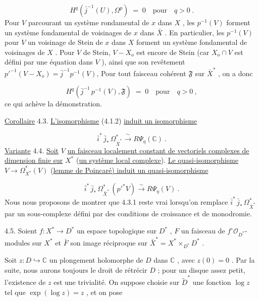 \begin{equation*}
H^q(\bar{j}^{-1}(U), \Omega^p) \;=\; 0 \quad \text{pour} \quad q > 0 \ .
\end{equation*}
Pour $V$ parcourant un système rondamental de $x$ dans $X$ , les $p^{-1}(V)$ forment un système fondamental de voisinages de $x$ dans $\bar{X}$ . En particulier, les $p^{-1}(V)$ pour $V$ un voisinage de Stein de $x$ dans $X$ forment un système fondamental de voisinages de $X$ . Pour $V$ de Stein, $V-X_o$ est encore de Stein (car $X_o \cap V$ est défini par une équation dans $V$ ), ainsi que son revêtement $p'^{-1}(V-X_o) = \bar{j}^{-1}p^{-1}(V)$,
Pour tout faisceau cohérent $\mathfrak{F}$ sur $\bar{X}^*$ , on a donc

\begin{equation*}
H^q(\bar{j}^{-1} \, p^{-1}(V), \mathfrak{F}) \;=\; 0 \quad \text{pour} \quad q > 0 \ ,
\end{equation*}
ce qui achève la démonstration.

\underline{Corollaire} 4.3.  \underline{L'isomorphisme} (4.1.2) \underline{induit un isomorphisme}

\begin{equation}\tag{4.3.1}
\bar{i}^* \, \bar{j}_* \, \Omega^*_{\bar{X}^*} \xrightarrow{\;\sim\;} R\Psi_\eta(\mathbb{C}) \ .
\end{equation}
\underline{Variante} 4.4.  \underline{Soit} $V$ \underline{un faisceau localement constant de vectoriels complexes de dimension finie sur} $X^*$ (\underline{un système local complexe}). \underline{Le quasi-isomorphisme} $V \longrightarrow \Omega^*_{X^*}(V)$ (\underline{lemme de Poincaré) induit un quasi-isomorphisme}

\begin{equation}\tag{4.4.1}
\bar{i}^* \, \bar{j}_* \, \Omega^*_{\bar{X}^*} \, (p'^* V) \xrightarrow{\;\sim\;} R\Psi_\eta(V) \ .
\end{equation}
Nous nous proposons de montrer que 4.3.1 reste vrai lorsqu'on remplace $\bar{i}^* \, \bar{j}_* \, \Omega^*_{\bar{X}^*}$ par un sous-complexe défini par des conditions de croissance et de monodromie.

4.5.  Soient $f : X^* \to D^*$ un espace topologique sur $D^*$ , $F$ un faisceau de $f^{\circ} \mathcal{O}_{D^*}$-modules sur $X^*$ et $\bar{F}$ son image réciproque sur $\bar{X}^* = X^* \times_{D^*} D^*$ .

Soit $z : D \hookrightarrow \mathbb{C}$ un plongement holomorphe de $D$ dans $\mathbb{C}$ , avec $z(0) = 0$ . Par la suite, nous aurons toujours le droit de rétrécir $D$ ; pour un disque assez petit, l'existence de $z$ est une trivialité. On suppose choisie sur $\tilde{D}^*$ une fonction $\log z$ tel que $\exp(\log z) = z$ , et on pose

